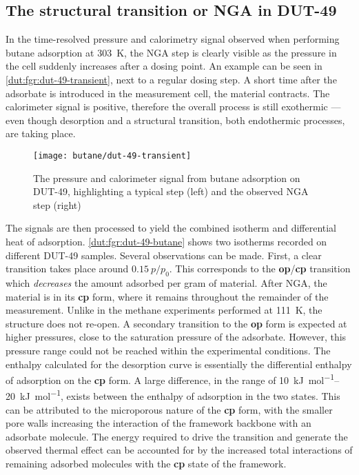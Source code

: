 
\subsection{The structural transition or NGA in DUT-49}

In the time-resolved pressure and calorimetry signal observed when
performing butane adsorption at \SI{303}{\kelvin}, the NGA step 
is clearly visible as the pressure in the cell suddenly increases 
after a dosing point. An example can be seen 
in \autoref{dut:fgr:dut-49-transient}, next to a regular dosing step.
A short time after the adsorbate is introduced in the measurement
cell, the material contracts. The calorimeter signal is
positive, therefore the overall process is still exothermic --- even
though desorption and a structural transition, both endothermic
processes, are taking place.

\begin{figure}[htb]
    \texttt{[image: butane/dut-49-transient]}%
    \caption{The pressure and calorimeter signal from butane adsorption
    on DUT-49, highlighting a typical step (left) and the 
    observed NGA step (right)}%
    \label{dut:fgr:dut-49-transient}
\end{figure}

The signals are then processed to yield the combined isotherm and
differential heat of adsorption. \autoref{dut:fgr:dut-49-butane} shows
two isotherms recorded on different DUT-49 samples. 
Several observations can be made. First, a clear transition takes place
around \(0.15~p/p_0\). This corresponds to the \textbf{op}/\textbf{cp} 
transition which \textit{decreases} the amount adsorbed per gram 
of material. After NGA, the material is in its \textbf{cp} form,
where it remains throughout the remainder of the measurement. 
Unlike in the methane experiments performed at 
\SI{111}{\kelvin}, the structure does not re-open. A secondary 
transition to the \textbf{op} form is expected at higher pressures,
close to the saturation pressure of the adsorbate. However, this 
pressure range could not be reached within the experimental conditions.
The enthalpy calculated for the desorption curve is essentially the 
differential enthalpy of adsorption on the \textbf{cp} form. A large 
difference, in the range of \SIrange{10}{20}{\kilo\joule\per\mol}, exists
between the enthalpy of adsorption in the two states. This can be 
attributed to the microporous nature of the \textbf{cp} form, with the
smaller pore walls increasing the interaction of the framework backbone
with an adsorbate molecule. The energy required to drive the 
transition and generate the observed thermal effect can be accounted 
for by the increased total interactions of remaining adsorbed 
molecules with the \textbf{cp} state of the framework.

